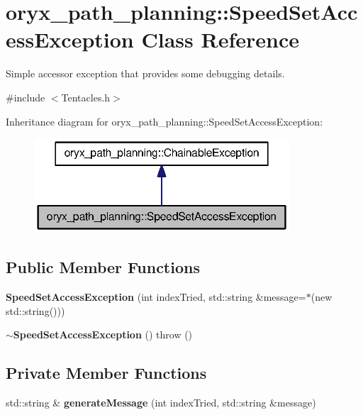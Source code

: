 \section{oryx\-\_\-path\-\_\-planning\-:\-:\-Speed\-Set\-Access\-Exception \-Class \-Reference}
\label{classoryx__path__planning_1_1SpeedSetAccessException}


\-Simple accessor exception that provides some debugging details.  




{\ttfamily \#include $<$\-Tentacles.\-h$>$}



\-Inheritance diagram for oryx\-\_\-path\-\_\-planning\-:\-:\-Speed\-Set\-Access\-Exception\-:
\nopagebreak
\begin{figure}[H]
\begin{center}
\leavevmode
\includegraphics[width=270pt]{classoryx__path__planning_1_1SpeedSetAccessException__inherit__graph}
\end{center}
\end{figure}
\subsection*{\-Public \-Member \-Functions}
\begin{DoxyCompactItemize}
\item 
{\bf \-Speed\-Set\-Access\-Exception} (int index\-Tried, std\-::string \&message=$\ast$(new std\-::string()))
\item 
{\bf $\sim$\-Speed\-Set\-Access\-Exception} ()  throw ()
\end{DoxyCompactItemize}
\subsection*{\-Private \-Member \-Functions}
\begin{DoxyCompactItemize}
\item 
std\-::string \& {\bf generate\-Message} (int index\-Tried, std\-::string \&message)
\end{DoxyCompactItemize}


